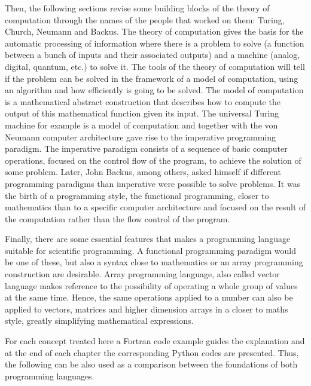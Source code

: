 Then, the following sections revise some building blocks of the theory of computation 
through the names of the people that worked on them: Turing, Church, Neumann and Backus. 
The theory of computation gives the basis for the automatic processing of information where there is a 
problem to solve (a function between a bunch of inputs and their associated outputs) 
and a machine (analog, digital, quantum, etc.) to solve it. 
The tools of the theory of computation will tell if the problem can be solved in the framework of a model of computation, 
using an algorithm and 
how efficiently is going to be solved. 
The model of computation is a mathematical abstract construction 
that describes how to compute the output of this mathematical function given its input.
The universal Turing machine for example is a model of computation and 
together with the von Neumann computer architecture gave rise 
to the imperative programming paradigm. 
The imperative paradigm consists of a sequence of basic computer operations, focused on the control flow of the program,
 to achieve the solution of some problem. 
Later, John Backus, among others, asked himself if different programming paradigms 
than imperative were possible to solve problems. 
It was the birth of a programming style, the functional programming, closer to mathematics than to a specific computer 
architecture and focused on the result of the computation rather than the flow control of the program. 

Finally, there are some essential features that makes a programming language suitable for scientific programming.
A functional programming paradigm would be one of these, but also a syntax close to mathematics 
or an array programming construction are desirable. 
Array programming language, also called vector language makes reference to the possibility 
of operating a whole group of values at the same time.
Hence, the same operations applied to a number can also be applied to vectors, matrices and higher dimension arrays
in a closer to maths style, greatly simplifying mathematical expressions.

For each concept treated here a Fortran code example guides the explanation and at the 
end of each chapter the corresponding Python codes are presented. Thus, the following
can be also used as a comparison between the foundations of both programming languages. 
 
 

 
